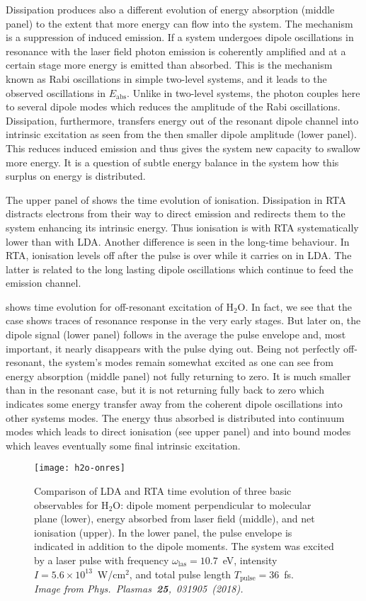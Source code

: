 \documentclass[11pt,a4paper]{article}
\begin{document}
			Dissipation produces also a different evolution of energy absorption (middle panel) to the extent that more energy can flow into the system. The mechanism is a suppression of induced emission. If a system undergoes dipole oscillations in resonance with the laser field photon emission is coherently amplified and at a certain stage more energy is emitted than absorbed. This is the mechanism known as Rabi oscillations in simple two-level systems, and it leads to the observed oscillations in $E_\mathrm{abs}$. Unlike in two-level systems, the photon couples here to several dipole modes which reduces the amplitude of the Rabi oscillations. Dissipation, furthermore, transfers energy out of the resonant dipole channel into intrinsic excitation as seen from the then smaller dipole amplitude (lower panel). This reduces induced emission and thus gives the system new capacity to swallow more energy. It is a question of subtle energy balance in the system how this surplus on energy is distributed.
			
			The upper panel of  shows the time evolution of ionisation. Dissipation in RTA distracts electrons from their way to direct emission and redirects them to the system enhancing its intrinsic energy. Thus ionisation is with RTA systematically lower than with LDA. Another difference is seen in the long-time behaviour. In RTA, ionisation levels off after the pulse is over while it carries on in LDA. The latter is related to the long lasting dipole oscillations which continue to feed the emission channel.
			
			 shows time evolution for off-resonant excitation of H$_2$O. In fact, we see that the case shows traces of resonance response in the very early stages. But later on, the dipole signal (lower panel) follows in the average the pulse envelope and, most important, it nearly disappears with the pulse dying out. Being not perfectly off-resonant, the system’s modes remain somewhat excited as one can see from energy absorption (middle panel) not fully returning to zero. It is much smaller than in the resonant case, but it is not returning fully back to zero which indicates some energy transfer away from the coherent dipole oscillations into other systems modes. The energy thus absorbed is distributed into continuum modes which leads to direct ionisation (see upper panel) and into bound modes which leaves eventually some final intrinsic excitation.
			
			\begin{figure}[!htbp]
				\centering
				\texttt{[image: h2o-onres]}
				\caption{Comparison of LDA and RTA time evolution of three basic observables for H$_2$O: dipole moment perpendicular to molecular plane (lower), energy absorbed from laser field (middle), and net ionisation (upper). In the lower panel, the pulse envelope is indicated in addition to the dipole moments. The system was excited by a laser pulse with frequency $\omega_\mathrm{las}=10.7$~eV, intensity $I=5.6\times10^{13}$~W/cm$^2$, and total pulse length $T_\mathrm{pulse}=36$~fs.\\{\sffamily\itshape Image from Phys.~Plasmas~\textbf{25},~031905~(2018).}}\label{fig:h2o-onres}
			\end{figure}
\end{document}
